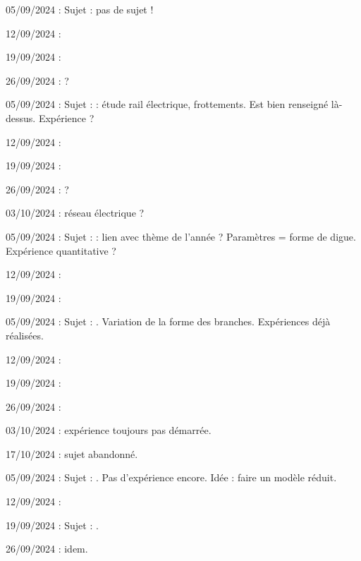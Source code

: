 \begin{liste}
  \item 05/09/2024 : Sujet : pas de sujet !
  \item 12/09/2024 : 
  \item 19/09/2024 : 
  \item 26/09/2024 : ?
\end{liste}

\begin{liste}
  \item 05/09/2024 : 
  Sujet :  : étude rail électrique, frottements. Est bien renseigné là-dessus. Expérience ?
  \item 12/09/2024 : 
  \item 19/09/2024 : 
  \item 26/09/2024 : ?
  \item  03/10/2024 : réseau électrique ? 

\end{liste}

\begin{liste}
  \item 05/09/2024 : Sujet :  : lien avec thème de l’année ? Paramètres = forme de digue. Expérience quantitative ?
  \item 12/09/2024 : 
  \item 19/09/2024 : 
\end{liste}

\begin{liste}
  \item 05/09/2024 : Sujet : . Variation de la forme des branches. Expériences déjà réalisées.
  \item 12/09/2024 : 
  \item 19/09/2024 : 
  \item 26/09/2024 :
  \item 03/10/2024 : expérience toujours pas démarrée.
  \item 17/10/2024 : sujet abandonné.
\end{liste}

\begin{liste}
  \item 05/09/2024 : Sujet : . Pas d’expérience encore. Idée : faire un modèle réduit.
  \item 12/09/2024 : 
  \item 19/09/2024 : Sujet : .
  \item 26/09/2024 : idem.
\end{liste}


